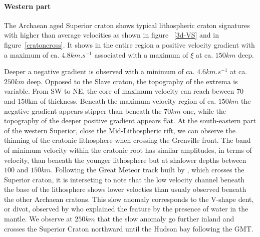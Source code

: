 \documentclass[12pt]{article}
\begin{document}
	\paragraph{Western part}



		The Archaean aged Superior craton shows typical lithospheric craton signatures with higher than average velocities as shown in figure ~\ref{3d-VS} and in figure~\ref{cratoncross}. 
		It shows in the entire region a positive velocity gradient with a maximum of ca. $4.8km.s^{-1}$  associated with a maximum of $\xi$ at ca. $150km$ deep.

		Deeper a negative gradient is observed with a minimum of ca. $4.6km.s^{-1}$ at ca. $250km$ deep. 
		Opposed to the Slave craton, the topography of the extrema is variable. 
		From SW to NE, the core of maximum velocity can reach beween 70 and 150km of thickness. 
		Beneath the maximum velocity region of ca. $150km$ the negative gradient appears stipper than beneath the $70km$ one, while the topography of the deeper positive gradient appears flat. 
		At the south-eastern part of the western Superior, close the Mid-Lithospheric rift, we can observe the thinning of the cratonic lithosphere when crossing the Grenville front. 
		The band of minimum velocity within the cratonic root has similar amplitudes, in terms of velocity, than beneath the younger lithosphere but at shalower depths between $100$ and $150km$. 
		Following the Great Meteor track built by \cite{heaman2000timing}, which crosses the Superior craton, it is interseting to note that the low velocity channel beneath the base of the lithosphere shows lower velocties than usualy observed beneath the other Archaean cratons. 
		This slow anomaly corresponds to the V-shape dent, or divot, observed by \cite{lee1997upper} who explained the feature by the presence of water in the mantle. 
		We observe at $250km$ that the slow anomaly go further inland and crosses the Superior Craton northward until the Hudson bay following the GMT.
\end{document}
